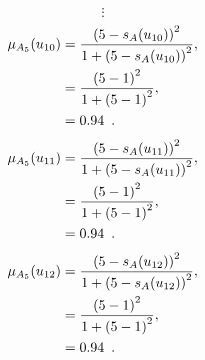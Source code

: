 \documentclass[a4paper,openany]{book}
\begin{document}
				\[
					\vdots
				\]
				\begin{align}
					\mu_{A_5}(u_{10}) &= \frac{\left(5-s_A(u_{10})\right)^2}{1 + \left(5-s_A(u_{10})\right)^2} ,\\
					&= \frac{\left(5-1\right)^2}{1 + \left(5-1\right)^2} \notag ,\\
					&= 0.94 \enspace. \notag
				\end{align}
				\begin{align}
					\mu_{A_5}(u_{11}) &= \frac{\left(5-s_A(u_{11})\right)^2}{1 + \left(5-s_A(u_{11})\right)^2} ,\\
					&= \frac{\left(5-1\right)^2}{1 + \left(5-1\right)^2} \notag ,\\
					&= 0.94 \enspace. \notag
				\end{align}
				\begin{align}
					\mu_{A_5}(u_{12}) &= \frac{\left(5-s_A(u_{12})\right)^2}{1 + \left(5-s_A(u_{12})\right)^2} ,\\
					&= \frac{\left(5-1\right)^2}{1 + \left(5-1\right)^2} \notag ,\\
					&= 0.94 \enspace. \notag
				\end{align}
\end{document}
